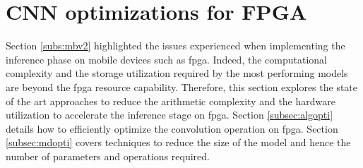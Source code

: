 \section{CNN optimizations for FPGA} \label{sec:opti_cnn}
%
%
Section \ref{subs:mbv2} highlighted the issues experienced when implementing the inference phase on mobile devices such as \acrshort{fpga}. Indeed, the computational complexity and the storage utilization required by the most performing models are beyond the \acrshort{fpga} resource capability. Therefore, this section explores the state of the art approaches to reduce the arithmetic complexity and the hardware utilization to accelerate the inference stage on \acrshort{fpga}. Section \ref{subsec:algopti} details how to efficiently optimize the convolution operation on \acrshort{fpga}. Section \ref{subsec:mdopti} covers techniques to reduce the size of the model and hence the number of parameters and operations required.
%

%

